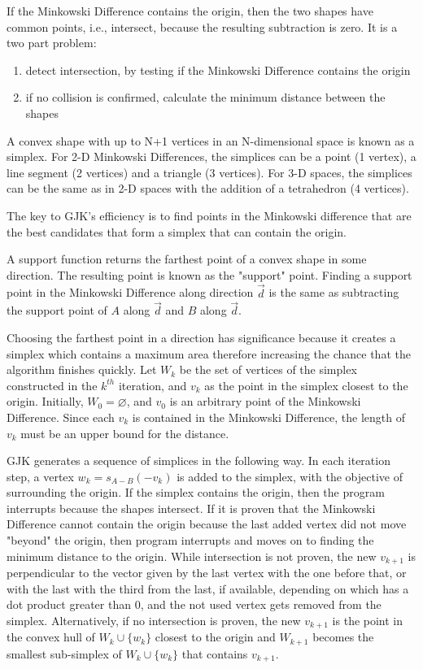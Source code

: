 \par If the Minkowski Difference contains the origin, then the two shapes have common points, i.e., intersect, because the resulting subtraction is zero. It is a two part problem: 
\begin{enumerate}
    \item detect intersection, by testing if the Minkowski Difference contains the origin
    \item if no collision is confirmed, calculate the minimum distance between the shapes
\end{enumerate}
\par A convex shape with up to N+1 vertices in an N-dimensional space is known as a simplex. For 2-D Minkowski Differences, the simplices can be a point (1 vertex), a line segment (2 vertices) and a triangle (3 vertices). For 3-D spaces, the simplices can be the same as in 2-D spaces with the addition of a tetrahedron (4 vertices).
\par The key to \ac{GJK}'s efficiency is to find points in the Minkowski difference that are the best candidates that form a simplex that can contain the origin. 
\par A support function returns the farthest point of a convex shape in some direction. The resulting point is known as the "support" point. Finding a support point in the Minkowski Difference along direction $\overrightarrow{d}$ is the same as subtracting the support point of $A$ along $\overrightarrow{d}$ and $B$ along $\overrightarrow{d}$. 
\par Choosing the farthest point in a direction has significance because it creates a simplex which contains a maximum area therefore increasing the chance that the algorithm finishes quickly. Let $W_k$ be the set of vertices of the simplex constructed in the $k^{th}$ iteration, and $v_k$ as the point in the simplex closest to the origin. Initially, $W_0=\varnothing$, and $v_0$ is an arbitrary point of the Minkowski Difference. Since each $v_k$ is contained in the Minkowski Difference, the length of $v_k$ must be an upper bound for the distance.
\par \ac{GJK} generates a sequence of simplices in the following way. In each iteration step, a vertex $w_k = s_{A-B}(-v_k)$ is added to the simplex, with the objective of surrounding the origin. If the simplex contains the origin, then the program interrupts because the shapes intersect. If it is proven that the Minkowski Difference cannot contain the origin because the last added vertex did not move "beyond" the origin, then program interrupts and moves on to finding the minimum distance to the origin. While intersection is not proven, the new $v_{k+1}$ is perpendicular to the vector given by the last vertex with the one before that, or with the last with the third from the last, if available, depending on which has a dot product greater than 0, and the not used vertex gets removed from the simplex. Alternatively, if no intersection is proven, the new $v_{k+1}$ is the point in the convex hull of $W_k\cup \{w_k\}$ closest to the origin and $W_{k+1}$ becomes the smallest sub-simplex of $W_k\cup \{w_k\}$ that contains $v_{k+1}$.


